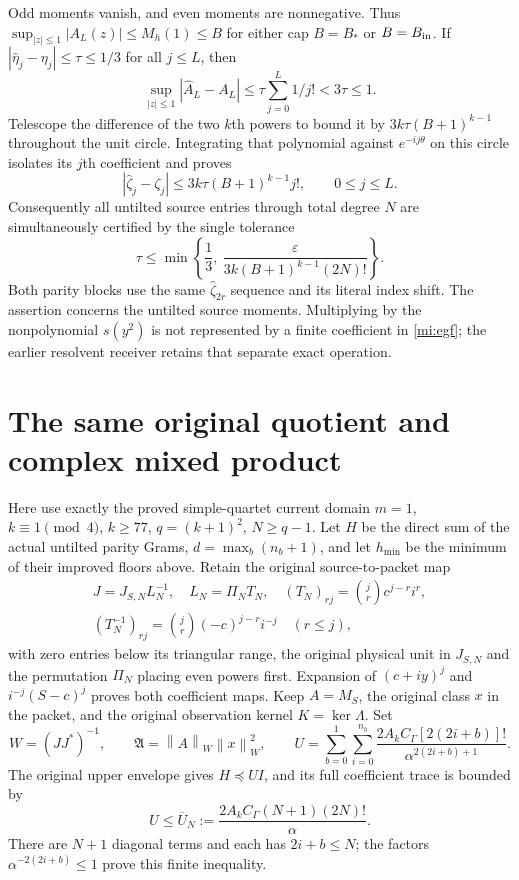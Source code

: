 \documentclass[11pt]{article}
\newcommand{\norm}[1]{\left\lVert#1\right\rVert}
\begin{document}
Odd moments vanish, and even moments are nonnegative. Thus
$\sup_{|z|\le1}|A_L(z)|\le M_h(1)\le B$ for either cap
$B=B_*$ or $B=B_{\rm in}$. If
$|\widehat\eta_j-\eta_j|\le\tau\le1/3$ for all $j\le L$, then
\[
 \sup_{|z|\le1}|\widehat A_L-A_L|
 \le\tau\sum_{j=0}^L1/j!<3\tau\le1.
\]
Telescope the difference of the two $k$th powers to bound it by
$3k\tau(B+1)^{k-1}$ throughout the unit circle.
Integrating that polynomial against $e^{-ij\theta}$ on this
circle isolates its $j$th coefficient and proves
\begin{equation}\tag{MI16}\label{mi:egferror}
 |\widehat\zeta_j-\zeta_j|
 \le3k\tau(B+1)^{k-1}j!,\qquad 0\le j\le L.
\end{equation}
Consequently all untilted source entries through total degree $N$
are simultaneously certified by the single tolerance
\begin{equation}\tag{MI17}\label{mi:tau}
 \tau\le\min\left\{\frac13,\
 \frac{\varepsilon}{3k(B+1)^{k-1}(2N)!}\right\}.
\end{equation}
Both parity blocks use the same $\widehat\zeta_{2r}$ sequence and
its literal index shift. The assertion concerns the untilted source
moments. Multiplying by the nonpolynomial $s(y^2)$ is not represented
by a finite coefficient in \eqref{mi:egf}; the earlier resolvent
receiver retains that separate exact operation.

\section{The same original quotient and complex mixed product}

Here use exactly the proved simple-quartet current domain
$m=1$, $k\equiv1\pmod4$, $k\ge77$, $q=(k+1)^2$, $N\ge q-1$.
Let $H$ be the direct sum of the actual untilted parity Grams,
$d=\max_b(n_b+1)$, and let $h_{\min}$ be the minimum of their
improved floors above. Retain the original source-to-packet map
\begin{equation}\tag{MI18}\label{mi:map}
 \begin{gathered}
 J=J_{S,N}L_N^{-1},\quad L_N=\Pi_NT_N,\quad
 (T_N)_{rj}=\binom jr c^{j-r}i^r,\\
 (T_N^{-1})_{rj}=\binom jr(-c)^{j-r}i^{-j}\quad(r\le j),
 \end{gathered}
\end{equation}
with zero entries below its triangular range, the original physical
unit in $J_{S,N}$ and the permutation $\Pi_N$ placing even powers
first. Expansion of $(c+iy)^j$ and $i^{-j}(S-c)^j$ proves both
coefficient maps. Keep $A=M_S$, the original class $x$ in the
packet, and the original observation kernel $K=\ker\Lambda$.
Set
\[
 W=(JJ^*)^{-1},\qquad
 \mathfrak A=\norm A_W\norm x_W^2,\qquad
 U=\sum_{b=0}^1\sum_{i=0}^{n_b}
 \frac{2A_kC_\Gamma[2(2i+b)]!}{\alpha^{2(2i+b)+1}}.
\]
The original upper envelope gives $H\preceq UI$, and its full
coefficient trace is bounded by
\begin{equation}\tag{MI19}\label{mi:U}
 U\le \overline U_N:=
 \frac{2A_kC_\Gamma(N+1)(2N)!}{\alpha}.
\end{equation}
There are $N+1$ diagonal terms and each has $2i+b\le N$;
the factors $\alpha^{-2(2i+b)}\le1$ prove this finite inequality.
\end{document}
